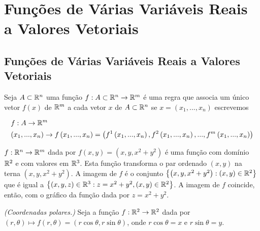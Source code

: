 \documentclass{book}
\begin{document}
\chapter{Fun\c c\~oes de V\'arias Vari\'aveis Reais a Valores Vetoriais} \label{chap05}

\section{Fun\c c\~oes de V\'arias Vari\'aveis Reais a Valores Vetoriais} \label{sec23}

\begin{defn}
Seja $A \subset \mathbb{R}^n$ uma fun\c c\~ao $f:A \subset \mathbb{R}^n \to \mathbb{R}^m$ \'e uma regra que associa um \'unico vetor $f(x)$ de $\mathbb{R}^m$ a cada vetor $x$ de $A \subset \mathbb{R}^n$ se $x = \left( {x_1 ,...,x_n } \right)$ escrevemos

\[
\begin{gathered}
  f:A \to \R^m  \hfill \\
  \left( {x_1 ,...,x_n } \right) \to f\left( {x_1 ,...,x_n } \right) = \left( {f^1 \left( {x_1 ,...,x_n } \right),f^2 \left( {x_1 ,...,x_n } \right),...,f^m \left( {x_1 ,...,x_n } \right)} \right) \hfill \\
\end{gathered}
\]

\end{defn}

\begin{ex}
$f:\mathbb{R}^n  \to \mathbb{R}^m$ dada por $f\left( {x,y} \right) = \left( {x,y,x^2  + y^2 } \right)$ \'e uma fun\c c\~ao com dom\'inio $\mathbb{R}^2$ e com valores em $\mathbb{R}^3$. Esta fun\c c\~ao transforma o par ordenado $(x,y)$ na terna $(x,y,x^2+y^2)$. A imagem de $f$ \'e o conjunto $\left\{ {\left( {x,y,x^2  + y^2 } \right):\left( {x,y} \right) \in \mathbb{R}^2 } \right\}$ que \'e igual a $\left\{ {\left( {x,y,z} \right) \in \mathbb{R}^3 :z = x^2  + y^2 ,\left( {x,y} \right) \in \mathbb{R}^2 } \right\}$. A imagem de $f$ coincide, ent\~ao, com o gr\'afico da fun\c c\~ao dada por $z=x^2+y^2$.

\end{ex}

\begin{ex}
\textit{(Coordenadas polares.)} Seja a fun\c c\~ao $f:\mathbb{R}^2  \to \mathbb{R}^2$ dada por $\left( {r,\theta } \right) \mapsto f\left( {r,\theta } \right) = \left( {r\cos \theta ,r\sin \theta } \right)$, onde $r\cos \theta = x$ e $r\sin \theta = y$.

\end{ex}
\end{document}
